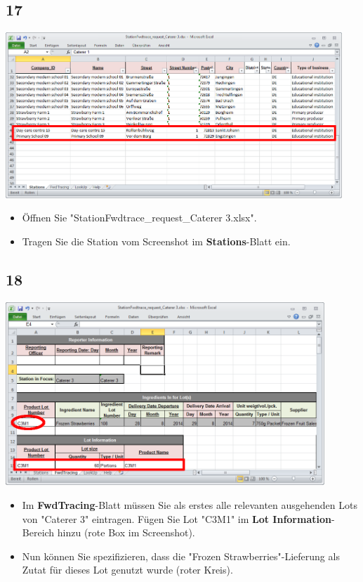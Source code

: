 \documentclass{beamer}
\begin{document}
\subsection{17}
\begin{frame}
	\begin{center}
  		\includegraphics[width=0.95\textwidth]{17.png}
	\end{center}
	\begin{itemize}
		\item Öffnen Sie "StationFwdtrace\_request\_Caterer 3.xlsx".
		\item Tragen Sie die Station vom Screenshot im \textbf{Stations}-Blatt ein.
	\end{itemize}
\end{frame}

\subsection{18}
\begin{frame}
	\begin{center}
  		\includegraphics[width=0.9\textwidth]{18.png}
	\end{center}
	\begin{itemize}
		\item Im \textbf{FwdTracing}-Blatt müssen Sie als erstes alle relevanten ausgehenden Lots von "Caterer 3" eintragen. Fügen Sie Lot "C3M1" im \textbf{Lot Information}-Bereich hinzu (rote Box im Screenshot).
		\item Nun können Sie spezifizieren, dass die "Frozen Strawberries"-Lieferung als Zutat für dieses Lot genutzt wurde (roter Kreis).
	\end{itemize}
\end{frame}
\end{document}
